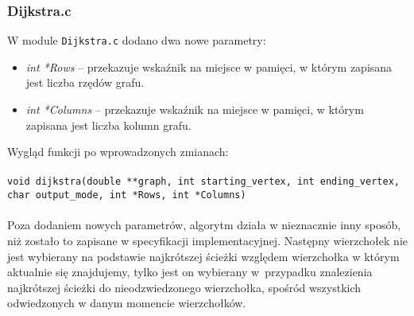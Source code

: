 \documentclass[12pt, a4paper]{article}
\begin{document}
\subsubsection{Dijkstra.c}
W module \texttt{Dijkstra.c} dodano dwa nowe parametry:
\begin{itemize}
\item \textit{int *Rows} -- przekazuje wskaźnik na miejsce w pamięci, w którym zapisana jest liczba rzędów grafu.

\item \textit{int *Columns} -- przekazuje wskaźnik na miejsce w pamięci, w którym zapisana jest liczba kolumn grafu.

\end{itemize}
Wygląd funkcji po wprowadzonych zmianach:\\\\
\texttt{void dijkstra(double **graph, int starting\_vertex, int ending\_vertex, char output\_mode, int *Rows, int *Columns)}\\\\
Poza dodaniem nowych parametrów, algorytm działa w nieznacznie inny sposób, niż zostało to zapisane w specyfikacji implementacyjnej. Następny wierzchołek nie jest wybierany na podstawie najkrótszej ścieżki względem wierzchołka w którym aktualnie się znajdujemy, tylko jest on wybierany w~przypadku znalezienia najkrótszej ścieżki do nieodzwiedzonego wierzchołka, spośród wszystkich odwiedzonych w danym momencie wierzchołków.
\end{document}
